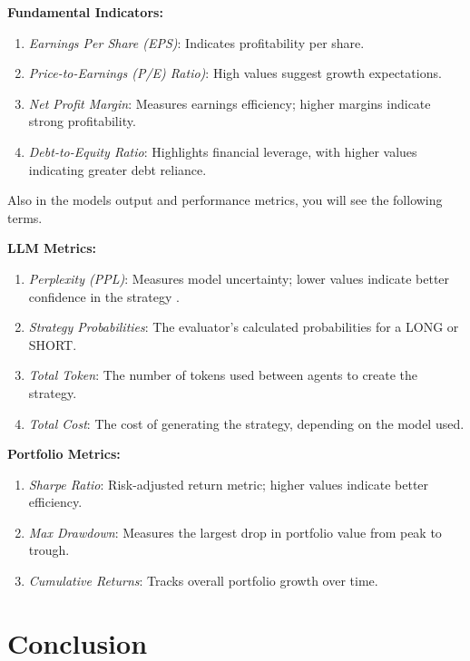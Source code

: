 \documentclass[8pt]{scrartcl}
\begin{document}
\begin{multicols}{2}
\textbf{Fundamental Indicators:}
\begin{enumerate}
    \item \textit{Earnings Per Share (EPS)}: Indicates profitability per share.
    \item \textit{Price-to-Earnings (P/E) Ratio)}: High values suggest growth expectations.
    \item \textit{Net Profit Margin}: Measures earnings efficiency; higher margins indicate strong profitability.
    \item \textit{Debt-to-Equity Ratio}: Highlights financial leverage, with higher values indicating greater debt reliance.
\end{enumerate}

\end{multicols}

Also in the models output and performance metrics, you will see the following terms.

\begin{multicols}{2}

\textbf{LLM Metrics:}
\begin{enumerate}
    \item \textit{Perplexity (PPL)}: Measures model uncertainty; lower values indicate better confidence in the strategy \cite{gonen-etal-2023-demystifying}.
    \item \textit{Strategy Probabilities}: The evaluator's calculated probabilities for a LONG or SHORT.
    \item \textit{Total Token}: The number of tokens used between agents to create the strategy.
    \item \textit{Total Cost}: The cost of generating the strategy, depending on the model used.
\end{enumerate}

\textbf{Portfolio Metrics:}
\begin{enumerate}
    \item \textit{Sharpe Ratio}: Risk-adjusted return metric; higher values indicate better efficiency.
    \item \textit{Max Drawdown}: Measures the largest drop in portfolio value from peak to trough.
    \item \textit{Cumulative Returns}: Tracks overall portfolio growth over time.
\end{enumerate}

\end{multicols}

\section{Conclusion}
\end{document}
